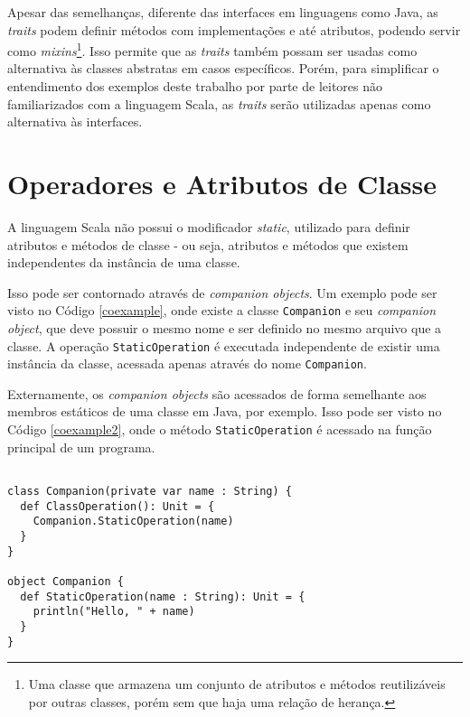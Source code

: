 Apesar das semelhanças, diferente das interfaces em 
linguagens como Java, as \textit{traits} podem definir métodos 
com implementações e até atributos, podendo servir 
como \textit{mixins}\footnote{
  Uma classe que armazena um conjunto de atributos e 
  métodos reutilizáveis por outras classes, porém sem 
  que haja uma relação de herança.
}\cite{wampler2021}. Isso permite que 
as \textit{traits} também possam ser usadas como alternativa 
às classes abstratas em casos específicos. Porém, para 
simplificar o entendimento dos exemplos deste 
trabalho por parte de leitores não familiarizados 
com a linguagem Scala, as \textit{traits} serão utilizadas 
apenas como alternativa às interfaces.


\section{Operadores e Atributos de Classe}

A linguagem Scala não possui o modificador \textit{static}, 
utilizado para definir atributos e métodos de classe - 
ou seja, atributos e métodos que existem independentes 
da instância de uma classe. 

Isso pode ser contornado através de \textit{companion objects}. 
Um exemplo pode ser visto no Código \ref{coexample}, onde 
existe a classe \texttt{Companion} e seu \textit{companion object}, que 
deve possuir o mesmo nome e ser definido no mesmo arquivo 
que a classe. A operação \texttt{StaticOperation} é executada 
independente de existir uma instância da classe, acessada 
apenas através do nome \texttt{Companion}.

Externamente, os \textit{companion objects} são acessados 
de forma semelhante aos membros estáticos de uma classe 
em Java, por exemplo. Isso pode ser visto no Código 
\ref{coexample2}, onde o método \texttt{StaticOperation} é acessado 
na função principal de um programa.

\begin{lstlisting}[caption={Exemplo de \textit{companion object}.},label=coexample]

class Companion(private var name : String) {
  def ClassOperation(): Unit = {
    Companion.StaticOperation(name)
  }
}

object Companion {
  def StaticOperation(name : String): Unit = {
    println("Hello, " + name)
  }
}

\end{lstlisting}

